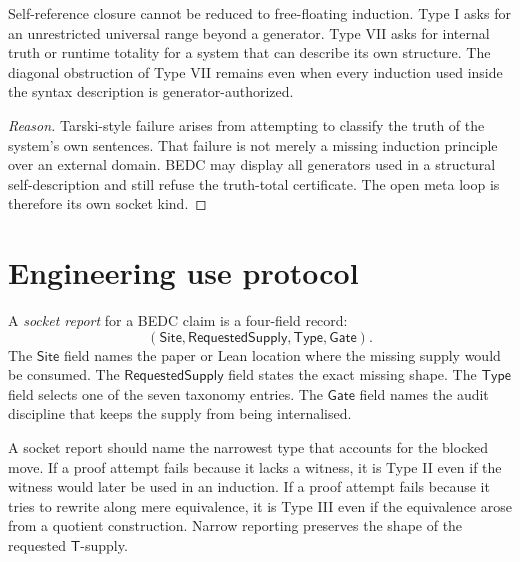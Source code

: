 \begin{lemma}
\label{lem:transcendental-supply-VII-not-I}
Self-reference closure cannot be reduced to free-floating induction. Type I asks for an unrestricted universal range beyond a generator. Type VII asks for internal truth or runtime totality for a system that can describe its own structure. The diagonal obstruction of Type VII remains even when every induction used inside the syntax description is generator-authorized.
\end{lemma}

\begin{proof}[Reason]
Tarski-style failure arises from attempting to classify the truth of the system's own sentences. That failure is not merely a missing induction principle over an external domain. BEDC may display all generators used in a structural self-description and still refuse the truth-total certificate. The open meta loop is therefore its own socket kind.
\end{proof}

\section{Engineering use protocol}
\label{sec:transcendental-supply-protocol}

\begin{definition}
\label{def:transcendental-supply-socket-report}
A \emph{socket report} for a BEDC claim is a four-field record:
$$
(\mathsf{Site},\mathsf{RequestedSupply},\mathsf{Type},\mathsf{Gate}).
$$
The $\mathsf{Site}$ field names the paper or Lean location where the missing supply would be consumed. The $\mathsf{RequestedSupply}$ field states the exact missing shape. The $\mathsf{Type}$ field selects one of the seven taxonomy entries. The $\mathsf{Gate}$ field names the audit discipline that keeps the supply from being internalised.
\end{definition}

\begin{principle}
\label{prin:transcendental-supply-minimal-reporting}
A socket report should name the narrowest type that accounts for the blocked move. If a proof attempt fails because it lacks a witness, it is Type II even if the witness would later be used in an induction. If a proof attempt fails because it tries to rewrite along mere equivalence, it is Type III even if the equivalence arose from a quotient construction. Narrow reporting preserves the shape of the requested $\mathsf{T}$-supply.
\end{principle}

